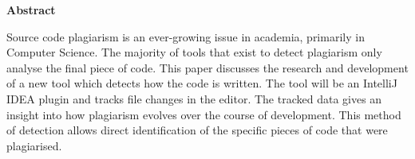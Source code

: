 \thispagestyle{empty}


\begin{center}
    {\LARGE\bf Abstract}
\end{center}

Source code plagiarism is an ever-growing issue in academia, primarily in Computer Science. The majority of tools that exist to detect plagiarism only analyse the final piece of code. This paper discusses the research and development of a new tool which detects how the code is written. The tool will be an IntelliJ IDEA plugin and tracks file changes in the editor. The tracked data gives an insight into how plagiarism evolves over the course of development. This method of detection allows direct identification of the specific pieces of code that were plagiarised.

